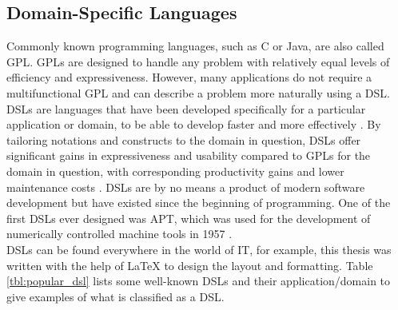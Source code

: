 \subsection{Domain-Specific Languages}\label{sec:dsl}
Commonly known programming languages, such as C or Java, are also called \ac{GPL}. \ac{GPL}s are designed to handle any problem with relatively equal levels of efficiency and expressiveness. However, many applications do not require a multifunctional \ac{GPL} and can describe a problem more naturally using a \ac{DSL}. \ac{DSL}s are languages that have been developed specifically for a particular application or domain, to be able to develop faster and more effectively \parencite[cf.][p. 1]{hudak_domain-specific_1997}. By tailoring notations and constructs to the domain in question, \ac{DSL}s offer significant gains in expressiveness and usability compared to \ac{GPL}s for the domain in question, with corresponding productivity gains and lower maintenance costs \parencite[cf.][p. 317]{mernik_when_2005}. \ac{DSL}s are by no means a product of modern software development but have existed since the beginning of programming. One of the first \ac{DSL}s ever designed was \ac{APT}, which was used for the development of numerically controlled machine tools in 1957 \parencite[cf.][pp. 283-284]{ross_origins_1978}.\\
\ac{DSL}s can be found everywhere in the world of IT, for example, this thesis was written with the help of \LaTeX{} to design the layout and formatting. Table \ref{tbl:popular_dsl} lists some well-known \ac{DSL}s and their application/domain to give examples of what is classified as a \ac{DSL}.
